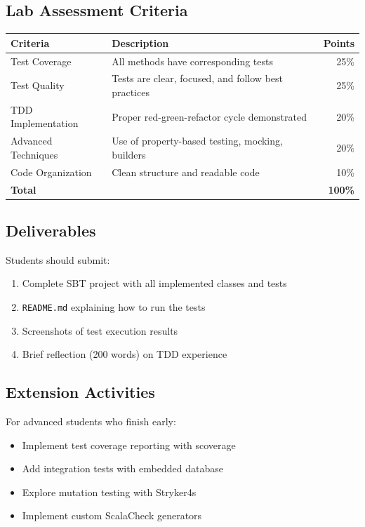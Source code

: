 \documentclass[12pt,a4paper]{article}
\begin{document}
\subsection{Lab Assessment Criteria}
\begin{table}[h]
\centering
\begin{tabularx}{\textwidth}{|l|X|r|}
\hline
\textbf{Criteria} & \textbf{Description} & \textbf{Points} \\
\hline
Test Coverage & All methods have corresponding tests & 25\% \\
Test Quality & Tests are clear, focused, and follow best practices & 25\% \\
TDD Implementation & Proper red-green-refactor cycle demonstrated & 20\% \\
Advanced Techniques & Use of property-based testing, mocking, builders & 20\% \\
Code Organization & Clean structure and readable code & 10\% \\
\hline
\textbf{Total} & & \textbf{100\%} \\
\hline
\end{tabularx}
\end{table}

\subsection{Deliverables}
Students should submit:
\begin{enumerate}
  \item Complete SBT project with all implemented classes and tests
  \item \texttt{README.md} explaining how to run the tests
  \item Screenshots of test execution results
  \item Brief reflection (200 words) on TDD experience
\end{enumerate}

\subsection{Extension Activities}
For advanced students who finish early:
\begin{itemize}
  \item Implement test coverage reporting with scoverage
  \item Add integration tests with embedded database
  \item Explore mutation testing with Stryker4s
  \item Implement custom ScalaCheck generators
\end{itemize}
\end{document}
